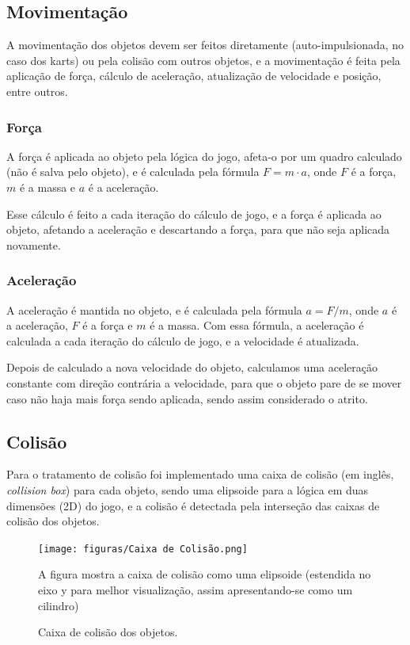 \subsection{Movimentação}

A movimentação dos objetos devem ser feitos diretamente (auto-impulsionada, no caso dos karts) ou pela colisão com outros objetos, e a movimentação é feita pela aplicação de força, cálculo de aceleração, atualização de velocidade e posição, entre outros.

\subsubsection{Força}

A força é aplicada ao objeto pela lógica do jogo, afeta-o por um quadro calculado (não é salva pelo objeto), e é calculada pela fórmula $F = m \cdot a$, onde $F$ é a força, $m$ é a massa e $a$ é a aceleração.

Esse cálculo é feito a cada iteração do cálculo de jogo, e a força é aplicada ao objeto, afetando a aceleração e descartando a força, para que não seja aplicada novamente.

\subsubsection{Aceleração}

A aceleração é mantida no objeto, e é calculada pela fórmula $a = F / m$, onde $a$ é a aceleração, $F$ é a força e $m$ é a massa. Com essa fórmula, a aceleração é calculada a cada iteração do cálculo de jogo, e a velocidade é atualizada.

Depois de calculado a nova velocidade do objeto, calculamos uma aceleração constante com direção contrária a velocidade, para que o objeto pare de se mover caso não haja mais força sendo aplicada, sendo assim considerado o atrito.

\subsection{Colisão}

Para o tratamento de colisão foi implementado uma caixa de colisão (em inglês, \textit{collision box}) para cada objeto, sendo uma elipsoide para a lógica em duas dimensões (2D) do jogo, e a colisão é detectada pela interseção das caixas de colisão dos objetos.

\begin{figure}[H]
    \centering
    \texttt{[image: figuras/Caixa de Colisão.png]}
    \caption{Caixa de colisão dos objetos.}
    \footnotesize{A figura mostra a caixa de colisão como uma elipsoide (estendida no eixo y para melhor visualização, assim apresentando-se como um cilindro)}
    \label{fig:collision-box}
\end{figure}

